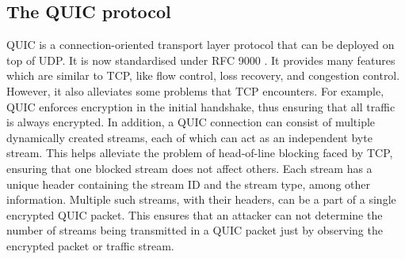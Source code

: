 \subsection{The QUIC protocol}
\label{subsec:netshaper-background-quic}

QUIC is a connection-oriented transport layer protocol that can be deployed on top of UDP.
It is now standardised under RFC 9000 \cite{quic_rfc}.
It provides many features which are similar to TCP, like flow control, loss recovery, and congestion control. 
However, it also alleviates some problems that TCP encounters.
For example, QUIC enforces encryption in the initial handshake, thus ensuring that all traffic is always encrypted.
In addition, a QUIC connection can consist of multiple dynamically created streams, each of which can act as an independent byte stream. 
This helps alleviate the problem of head-of-line blocking faced by TCP, ensuring that one blocked stream does not affect others.
Each stream has a unique header containing the stream ID and the stream type, among other information.
Multiple such streams, with their headers, can be a part of a single encrypted QUIC packet.
This ensures that an attacker can not determine the number of streams being transmitted in a QUIC packet just by observing the encrypted packet or traffic stream.


\endinput

\footnote{While QUIC has a PADDING frame, we don't use it, as a packet that only contains padding frames will not be re-transmitted in case of packet loss, thus revealing that it was a dummy packet.}

